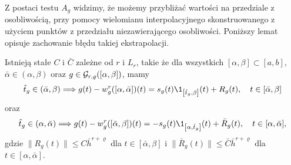 \documentclass[oik, pdftex, man]{mgrwms}
\begin{document}
    Z postaci testu $A_{g}$ widzimy, że możemy przybliżać wartości na przedziale z osobliwością, przy pomocy wielomianu interpolacyjnego skonstruowanego z użyciem punktów z przedziału niezawierającego osobliwości. Poniższy lemat opisuje zachowanie błędu takiej ekstrapolacji.

    \begin{lemma} \label{lem:2:2014}
        Istnieją stałe $C$ i $\bar{C}$ zależne od $r$ i $L_{r}$, takie że dla wszystkich $[\alpha, \beta] \subset [a,b]$, $\bar{\alpha} \in (\alpha, \beta)$ oraz $g \in \mathcal{G}_{r,\varrho}([\alpha,\beta])$, mamy
        \begin{equation*}
            \hat{t}_{g} \in(\bar{\alpha}, \beta) \Longrightarrow g(t)-w_{g}^{r}([\alpha, \bar{\alpha}])(t)=s_{g}(t) \1_{\left[\hat{t}_{g}, \beta\right]}(t)+R_{g}(t), \quad t \in[\bar{\alpha}, \beta]
        \end{equation*}
        oraz
        \begin{equation*}
            \hat{t}_{g} \in (\alpha,\bar{\alpha}) \Longrightarrow g(t)-w_{g}^{r}([\bar{\alpha}, \beta])(t)= -s_{g}(t) \1_{\left[\alpha,\hat{t}_{g}\right]}(t)+\bar{R}_{g}(t), \quad t \in[\alpha,\bar{\alpha}],
        \end{equation*}
        gdzie $\| R_{g}(t) \| \leq C\bar{h}^{r+\varrho}$ dla $t \in [\bar{\alpha}, \beta]$ i $\| \bar{R}_{g}(t) \| \leq \bar{C}\bar{h}^{r+\varrho}$ dla $t \in [\alpha,\bar{\alpha}]$.
    \end{lemma}
\end{document}
